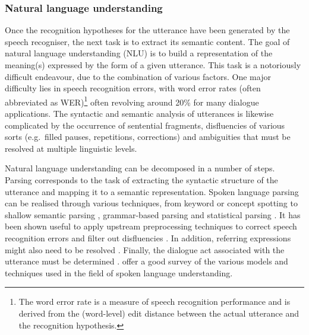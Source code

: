 \subsubsection*{Natural language understanding}
\label{section:speechunderstanding}

Once the recognition hypotheses for the utterance have been generated by the speech recogniser, the next task is to extract its semantic content.  The goal of natural language understanding (NLU) is to build a representation of the meaning(s) expressed by the form of a given utterance.  This task is a notoriously difficult endeavour, due to the combination of various factors. One major difficulty lies in speech recognition errors, with word error rates (often abbreviated as WER)\footnote{The word error rate is a measure of speech recognition performance and is derived from the (word-level) edit distance between the actual utterance and the recognition hypothesis.} often revolving around 20\% for many dialogue applications.  The syntactic and semantic analysis of utterances is likewise complicated by the occurrence of sentential fragments,  disfluencies of various sorts (e.g.\ filled pauses, repetitions, corrections) and ambiguities that must be resolved at multiple linguistic levels. 

Natural language understanding can be decomposed in a number of steps.  Parsing corresponds to the task of extracting the syntactic structure of the utterance and mapping it to a semantic representation.  Spoken language parsing can be realised through various techniques, from keyword or concept spotting \citep{KomataniTKK01,ZhangZY07} to shallow semantic parsing \citep{Coppola:2009}, grammar-based parsing \citep{VanNoord1999} and statistical parsing \citep{He200585}.  It has been shown useful to apply upstream preprocessing techniques to correct speech recognition errors \citep{Ringger:1996} and filter out disfluencies \citep{Johnson:2004}. In addition, referring expressions might also need to be resolved \citep{Funakoshi:2012}.  Finally, the dialogue act associated with the utterance must be determined \citep{stolcke2000,Keizer2007}. \cite{demori2008} offer a good survey of the various models and techniques used in the field of spoken language understanding. 

